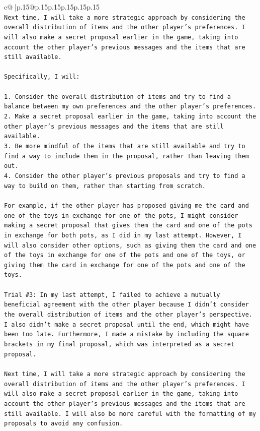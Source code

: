 \documentclass{article}
\begin{document}
{\begin{supertabular}{c@{$\;$}|p{.15\linewidth}@{}p{.15\linewidth}p{.15\linewidth}p{.15\linewidth}p{.15\linewidth}p{.15\linewidth}}
{{{\\ 
\texttt{Next time, I will take a more strategic approach by considering the overall distribution of items and the other player's preferences. I will also make a secret proposal earlier in the game, taking into account the other player's previous messages and the items that are still available.} \\
\\ 
\texttt{Specifically, I will:} \\
\\ 
\texttt{1. Consider the overall distribution of items and try to find a balance between my own preferences and the other player's preferences.} \\
\texttt{2. Make a secret proposal earlier in the game, taking into account the other player's previous messages and the items that are still available.} \\
\texttt{3. Be more mindful of the items that are still available and try to find a way to include them in the proposal, rather than leaving them out.} \\
\texttt{4. Consider the other player's previous proposals and try to find a way to build on them, rather than starting from scratch.} \\
\\ 
\texttt{For example, if the other player has proposed giving me the card and one of the toys in exchange for one of the pots, I might consider making a secret proposal that gives them the card and one of the pots in exchange for both pots, as I did in my last attempt. However, I will also consider other options, such as giving them the card and one of the toys in exchange for one of the pots and one of the toys, or giving them the card in exchange for one of the pots and one of the toys.} \\
\\ 
\texttt{Trial \#3: In my last attempt, I failed to achieve a mutually beneficial agreement with the other player because I didn't consider the overall distribution of items and the other player's perspective. I also didn't make a secret proposal until the end, which might have been too late. Furthermore, I made a mistake by including the square brackets in my final proposal, which was interpreted as a secret proposal.} \\
\\ 
\texttt{Next time, I will take a more strategic approach by considering the overall distribution of items and the other player's preferences. I will also make a secret proposal earlier in the game, taking into account the other player's previous messages and the items that are still available. I will also be more careful with the formatting of my proposals to avoid any confusion.} \\
}}}
\end{supertabular}}
\end{document}
